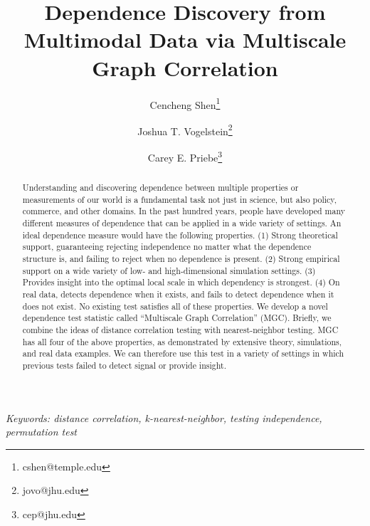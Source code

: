 \documentclass[11pt]{article}
\begin{document}
\def\spacingset#1{\renewcommand{\baselinestretch}%
{#1}\small\normalsize} \spacingset{1}

\title{\bf Dependence Discovery from Multimodal Data via  Multiscale Graph Correlation}
\author[1]{Cencheng Shen\thanks{cshen@temple.edu}}
\author[2]{Joshua T. Vogelstein\thanks{jovo@jhu.edu}}
\author[3]{Carey E. Priebe\thanks{cep@jhu.edu}}
\maketitle
\pagestyle{empty}

\bigskip
\begin{abstract}
Understanding and discovering dependence between multiple properties or measurements of our world is a fundamental task not just in science, but also policy, commerce, and other domains. In the past hundred years, people have developed many different measures of dependence that can be applied in a wide variety of settings.  An ideal dependence measure would have the following properties. (1) Strong theoretical support, guaranteeing rejecting independence no matter what the dependence structure is, and failing to reject when no dependence is present. (2) Strong empirical support on a wide variety of low- and high-dimensional simulation settings. (3) Provides insight into the optimal local scale in which dependency is strongest. (4) On real data, detects dependence when it exists, and fails to detect dependence when it does not exist. No existing test satisfies all of these properties. We develop a novel dependence test statistic called ``Multiscale Graph Correlation'' (MGC).  Briefly, we combine the ideas of distance correlation testing with nearest-neighbor testing.  MGC has all four of the above properties, as demonstrated by extensive theory, simulations, and real data examples. We can therefore use this test in a variety of settings in which previous tests failed to detect signal or provide insight.
\end{abstract}

\noindent%
{\it Keywords: distance correlation, k-nearest-neighbor, testing independence, permutation test}  
\vfill

\clearpage
\tableofcontents

\end{document}
